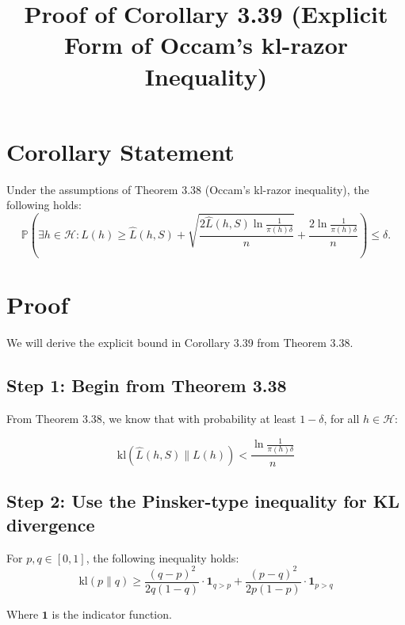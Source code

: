 \documentclass{article}
\title{Proof of Corollary 3.39 (Explicit Form of Occam's kl-razor Inequality)}
\author{}
\date{}
\begin{document}
\maketitle

\section{Corollary Statement}
\begin{corollary}
Under the assumptions of Theorem 3.38 (Occam's kl-razor inequality), the following holds:
\begin{equation}
\mathbb{P}\left(\exists h \in \mathcal{H} : L(h) \geq \hat{L}(h, S) + \sqrt{\frac{2\hat{L}(h,S)\ln \frac{1}{\pi(h)\delta}}{n}} + \frac{2\ln \frac{1}{\pi(h)\delta}}{n}\right) \leq \delta.
\end{equation}
\end{corollary}

\section{Proof}

We will derive the explicit bound in Corollary 3.39 from Theorem 3.38.

\subsection{Step 1: Begin from Theorem 3.38}

From Theorem 3.38, we know that with probability at least $1-\delta$, for all $h \in \mathcal{H}$:

\begin{equation}
\text{kl}(\hat{L}(h,S)\|L(h)) < \frac{\ln \frac{1}{\pi(h)\delta}}{n}
\end{equation}

\subsection{Step 2: Use the Pinsker-type inequality for KL divergence}

For $p, q \in [0,1]$, the following inequality holds:
\begin{equation}
\text{kl}(p\|q) \geq \frac{(q-p)^2}{2q(1-q)} \cdot \mathbf{1}_{q > p} + \frac{(p-q)^2}{2p(1-p)} \cdot \mathbf{1}_{p > q}
\end{equation}

Where $\mathbf{1}$ is the indicator function.
\end{document}
